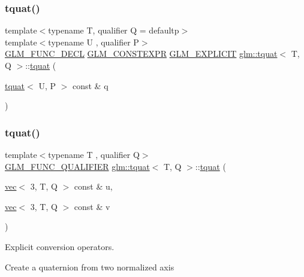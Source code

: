 \subsubsection{\texorpdfstring{tquat()}{tquat()}\hspace{0.1cm}{\footnotesize\ttfamily [6/12]}}
{\footnotesize\ttfamily template$<$typename T, qualifier Q = defaultp$>$ \\
template$<$typename U , qualifier P$>$ \\
\hyperlink{setup_8hpp_ab2d052de21a70539923e9bcbf6e83a51}{G\+L\+M\+\_\+\+F\+U\+N\+C\+\_\+\+D\+E\+CL} \hyperlink{setup_8hpp_a08b807947b47031d3a511f03f89645ad}{G\+L\+M\+\_\+\+C\+O\+N\+S\+T\+E\+X\+PR} \hyperlink{setup_8hpp_a6c74f5a5e7b134ab69023ff9a30d4d5d}{G\+L\+M\+\_\+\+E\+X\+P\+L\+I\+C\+IT} \hyperlink{structglm_1_1tquat}{glm\+::tquat}$<$ T, Q $>$\+::\hyperlink{structglm_1_1tquat}{tquat} (\begin{DoxyParamCaption}\item[{\hyperlink{structglm_1_1tquat}{tquat}$<$ U, P $>$ const \&}]{q }\end{DoxyParamCaption})}

\mbox{\label{structglm_1_1tquat_ad0b0aeae222fe05fb5d26fd40d74b9b6}} 
\subsubsection{\texorpdfstring{tquat()}{tquat()}\hspace{0.1cm}{\footnotesize\ttfamily [7/12]}}
{\footnotesize\ttfamily template$<$typename T , qualifier Q$>$ \\
\hyperlink{setup_8hpp_a33fdea6f91c5f834105f7415e2a64407}{G\+L\+M\+\_\+\+F\+U\+N\+C\+\_\+\+Q\+U\+A\+L\+I\+F\+I\+ER} \hyperlink{structglm_1_1tquat}{glm\+::tquat}$<$ T, Q $>$\+::\hyperlink{structglm_1_1tquat}{tquat} (\begin{DoxyParamCaption}\item[{\hyperlink{structglm_1_1vec}{vec}$<$ 3, T, Q $>$ const \&}]{u,  }\item[{\hyperlink{structglm_1_1vec}{vec}$<$ 3, T, Q $>$ const \&}]{v }\end{DoxyParamCaption})}



Explicit conversion operators. 

Create a quaternion from two normalized axis


